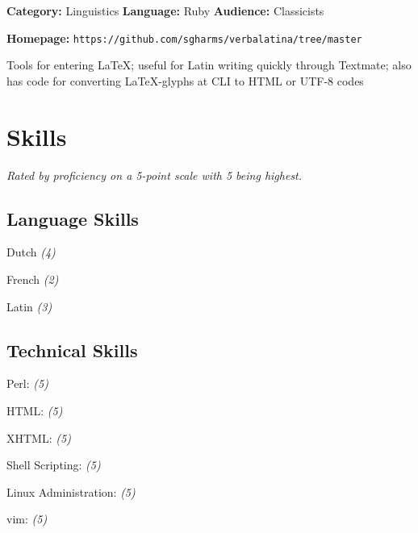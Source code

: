 \documentclass[]{article}
\begin{document}
{\bf Category:} Linguistics  {\bf Language:} Ruby {\bf Audience:} Classicists

{\bf Homepage:} {\tt https://github.com/sgharms/verbalatina/tree/master}
\vspace{0.05in}

Tools for entering \LaTeX; useful for Latin writing quickly through Textmate; also has code for converting \LaTeX-glyphs at CLI to HTML or UTF-8 codes








\section*{Skills}



\emph{Rated by proficiency on a 5-point scale with 5 being highest.}
\subsection*{Language Skills}
Dutch \emph{(4)}
  \label{dutch4}

       

French \emph{(2)}
  \label{french2}

       

Latin \emph{(3)}
  \label{latin3}

       
	
\subsection*{Technical Skills}	
 Perl: \emph{(5)}
  \label{perl5}

       

 HTML: \emph{(5)}
  \label{html5}

       

 XHTML: \emph{(5)}
  \label{xhtml5}

       

 Shell Scripting: \emph{(5)}
  \label{shellscripting5}

       

 Linux Administration: \emph{(5)}
  \label{linuxadministration5}

       

 vim: \emph{(5)}
  \label{vim5}

       
\end{document}
